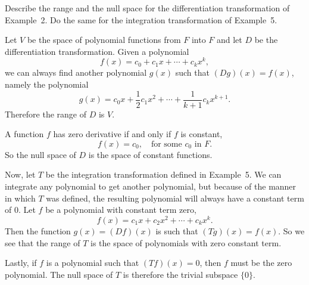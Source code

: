  Describe the range and the null space for the
differentiation transformation of Example~2. Do the same for the
integration transformation of Example~5.
\begin{solution}
  Let $V$ be the space of polynomial functions from $F$ into $F$ and
  let $D$ be the differentiation transformation. Given a polynomial
  \begin{equation*}
    f(x) = c_0 + c_1x + \cdots + c_kx^k,
  \end{equation*}
  we can always find another polynomial $g(x)$ such that
  $(Dg)(x) = f(x)$, namely the polynomial
  \begin{equation*}
    g(x) = c_0x + \frac12c_1x^2 + \cdots + \frac1{k+1}c_kx^{k+1}.
  \end{equation*}
  Therefore the range of $D$ is $V$.

  A function $f$ has zero derivative if and only if $f$ is constant,
  \begin{equation*}
    f(x) = c_0, \quad \text{for some $c_0$ in $F$.}
  \end{equation*}
  So the null space of $D$ is the space of constant functions.

  Now, let $T$ be the integration transformation defined in
  Example~5. We can integrate any polynomial to get another
  polynomial, but because of the manner in which $T$ was defined, the
  resulting polynomial will always have a constant term of $0$. Let
  $f$ be a polynomial with constant term zero,
  \begin{equation*}
    f(x) = c_1x + c_2x^2 + \cdots + c_kx^k.
  \end{equation*}
  Then the function $g(x) = (Df)(x)$ is such that $(Tg)(x) = f(x)$. So
  we see that the range of $T$ is the space of polynomials with zero
  constant term.

  Lastly, if $f$ is a polynomial such that $(Tf)(x) = 0$, then $f$
  must be the zero polynomial. The null space of $T$ is therefore the
  trivial subspace $\{0\}$.
\end{solution}

